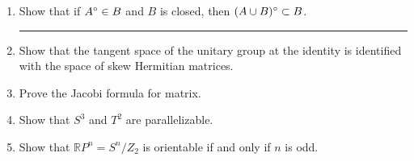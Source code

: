 \documentclass[11pt]{article}
\begin{document}
\begin{enumerate}
\hrule
\item Show that if $A^\circ\in B$ and $B$ is closed, then $(A\cup B)^\circ\subset B$.

\hrule
\item Show that the tangent space of the unitary group at the identity is identified with the space of skew Hermitian matrices.
\item Prove the Jacobi formula for matrix.
\item Show that $S^3$ and $T^2$ are parallelizable.
\item Show that $\mathbb{R}P^n=S^n/Z_2$ is orientable if and only if $n$ is odd.
\end{enumerate}
\end{document}
